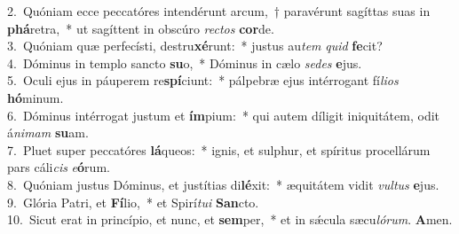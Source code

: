 {2.~}Quóniam ecce peccatóres intendérunt arcum,~† paravérunt sagíttas suas in \textbf{phá}retra,~* ut sagíttent in obscúro \textit{re}\textit{ctos} \textbf{cor}de.\\
{3.~}Quóniam quæ perfecísti, destru\textbf{xé}runt:~* justus au\textit{tem} \textit{quid} \textbf{fe}cit?\\
{4.~}Dóminus in templo sancto \textbf{su}o,~* Dóminus in cælo \textit{se}\textit{des} \textbf{e}jus.\\
{5.~}Oculi ejus in páuperem re\textbf{spí}ciunt:~* pálpebræ ejus intérrogant fí\textit{li}\textit{os} \textbf{hó}minum.\\
{6.~}Dóminus intérrogat justum et \textbf{ím}pium:~* qui autem díligit iniquitátem, odit á\textit{ni}\textit{mam} \textbf{su}am.\\
{7.~}Pluet super peccatóres \textbf{lá}queos:~* ignis, et sulphur, et spíritus procellárum pars cáli\textit{cis} \textit{e}\textbf{ó}rum.\\
{8.~}Quóniam justus Dóminus, et justítias di\textbf{lé}xit:~* æquitátem vidit \textit{vul}\textit{tus} \textbf{e}jus.\\
{9.~}Glória Patri, et \textbf{Fí}lio,~* et Spirí\textit{tu}\textit{i} \textbf{San}cto.\\
{10.~}Sicut erat in princípio, et nunc, et \textbf{sem}per,~* et in sǽcula sæcu\textit{ló}\textit{rum}. \textbf{A}men.\\

